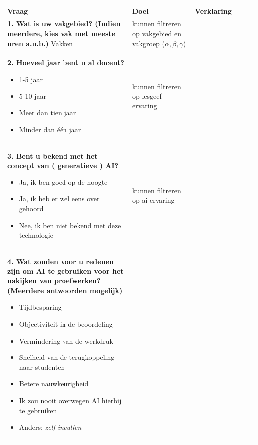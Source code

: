 \documentclass[12pt]{article}
\begin{document}
\pagebreak
\begin{longtable}{p{0.5\linewidth}|p{0.25\linewidth}|p{0.25\linewidth}}
    Vraag & Doel & Verklaring \\
    \endhead
    \hline 
    \begin{minipage}[t]{\linewidth}
        \textbf{1. Wat is uw vakgebied? (Indien meerdere, kies vak met meeste uren a.u.b.) }
        \hspace{4em} Vakken        
    \end{minipage} & kunnen filtreren op vakgebied en vakgroep ($\alpha, \beta, \gamma$) & \\
    \hline 
    \begin{minipage}[t]{\linewidth}
        \textbf{2. Hoeveel jaar bent u al docent? }
        \begin{itemize}
            \item 1-5 jaar
            \item 5-10 jaar
            \item Meer dan tien jaar
            \item Minder dan één jaar
        \end{itemize}
    \end{minipage} & kunnen filtreren op lesgeef ervaring & \\
    \hline 
    \begin{minipage}[t]{\linewidth}
        \textbf{3. Bent u bekend met het concept van ( generatieve ) AI? }
        \begin{itemize}
            \item Ja, ik ben goed op de hoogte
            \item Ja, ik heb er wel eens over gehoord
            \item Nee, ik ben niet bekend met deze technologie
        \end{itemize}
    \end{minipage} & kunnen filtreren op ai ervaring & \\
    \hline 
    \begin{minipage}[t]{\linewidth}
        \textbf{4. Wat zouden voor u redenen zijn om AI te gebruiken voor het nakijken van proefwerken? (Meerdere antwoorden mogelijk) }
        \begin{itemize}
            \item Tijdbesparing
            \item Objectiviteit in de beoordeling
            \item Vermindering van de werkdruk
            \item Snelheid van de terugkoppeling naar studenten
            \item Betere nauwkeurigheid
            \item Ik zou nooit overwegen AI hierbij te gebruiken
            \item Anders: \textit{zelf invullen}


\end{itemize}
\end{minipage}
\end{longtable}
\end{document}
